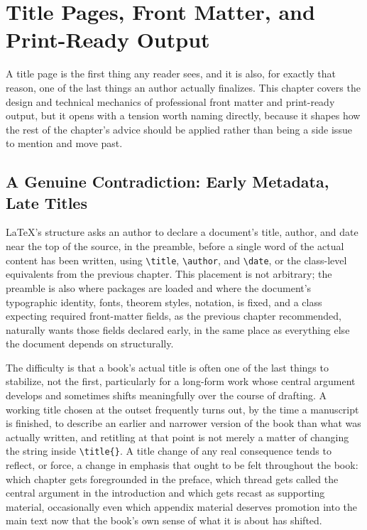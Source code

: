 \hypertarget{chapter-17-title-pages-front-matter-and-print-ready-output}{%
\chapter{Title Pages, Front Matter, and Print-Ready Output}\label{chapter-17-title-pages-front-matter-and-print-ready-output}}

A title page is the first thing any reader sees, and it is also, for exactly that reason, one of the last things an author actually finalizes. This chapter covers the design and technical mechanics of professional front matter and print-ready output, but it opens with a tension worth naming directly, because it shapes how the rest of the chapter's advice should be applied rather than being a side issue to mention and move past.

\hypertarget{a-genuine-contradiction-early-metadata-late-titles}{%
\section{A Genuine Contradiction: Early Metadata, Late Titles}\label{a-genuine-contradiction-early-metadata-late-titles}}

LaTeX's structure asks an author to declare a document's title, author, and date near the top of the source, in the preamble, before a single word of the actual content has been written, using \texttt{\textbackslash{}title}, \texttt{\textbackslash{}author}, and \texttt{\textbackslash{}date}, or the class-level equivalents from the previous chapter. This placement is not arbitrary; the preamble is also where packages are loaded and where the document's typographic identity, fonts, theorem styles, notation, is fixed, and a class expecting required front-matter fields, as the previous chapter recommended, naturally wants those fields declared early, in the same place as everything else the document depends on structurally.

The difficulty is that a book's actual title is often one of the last things to stabilize, not the first, particularly for a long-form work whose central argument develops and sometimes shifts meaningfully over the course of drafting. A working title chosen at the outset frequently turns out, by the time a manuscript is finished, to describe an earlier and narrower version of the book than what was actually written, and retitling at that point is not merely a matter of changing the string inside \texttt{\textbackslash{}title\{\}}. A title change of any real consequence tends to reflect, or force, a change in emphasis that ought to be felt throughout the book: which chapter gets foregrounded in the preface, which thread gets called the central argument in the introduction and which gets recast as supporting material, occasionally even which appendix material deserves promotion into the main text now that the book's own sense of what it is about has shifted.

